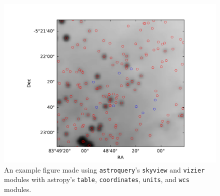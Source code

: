 \documentclass[twocolumn]{aastex61}
\newcommand{\package}[1]{\texttt{#1}\xspace}
\newcommand{\astroquery}{\package{astroquery}}
\begin{document}
\begin{figure}[!htp]
\includegraphics[scale=1,width=7in]{example_figure_1.pdf}
\caption{An example figure made using \astroquery's \texttt{skyview} and
\texttt{vizier} modules with astropy's \texttt{table}, \texttt{coordinates},
\texttt{units}, and \texttt{wcs} modules.}
\label{fig:example1}
\end{figure}
\end{document}
